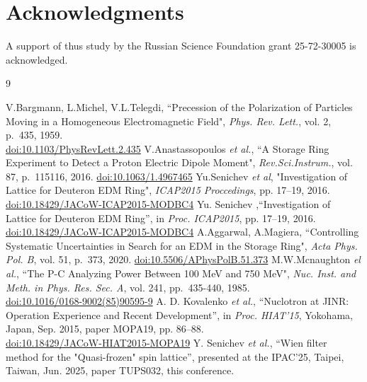 \documentclass[a4paper,
               keeplastbox,   %
               ]{jacow}
\begin{document}
\section{Acknowledgments}

\par A support of thus study by the Russian Science Foundation grant 25-72-30005 is acknowledged.

	{\printbibliography}
	{
	\begin{thebibliography}{9}
	
	 V.Bargmann, L.Michel, V.L.Telegdi, ``Precession of the Polarization of Particles Moving in a Homogeneous Electromagnetic Field", \emph{Phys. Rev. Lett.}, vol. 2, p.~435, 1959.\\ \url{doi:10.1103/PhysRevLett.2.435}
	 V.Anastassopoulos \emph{et al.}, ``A Storage Ring Experiment to Detect a Proton Electric Dipole Moment",  \emph{Rev.Sci.Instrum.}, vol. 87, p.~115116, 2016. \url{doi:10.1063/1.4967465}
	 Yu.Senichev \emph{et al}, "Investigation of Lattice for Deuteron EDM Ring", \textit{ICAP2015 Proccedings}, pp. 17--19, 2016. \url{doi:10.18429/JACoW-ICAP2015-MODBC4}
	 Yu. Senichev ,\textquotedblleft{Investigation of Lattice for Deuteron EDM Ring}\textquotedblright, in \emph{Proc. ICAP2015}, pp. 17--19, 2016. \url{doi:10.18429/JACoW-ICAP2015-MODBC4}
	 A.Aggarwal, A.Magiera, ``Controlling Systematic Uncertainties in Search for an EDM in the Storage Ring",  \emph{Acta Phys. Pol. B}, vol. 51, p.~373, 2020. \url{doi:10.5506/APhysPolB.51.373}
	 M.W.Mcnaughton \emph{el al.}, ``The P-C Analyzing Power Between 100 MeV and 750 MeV", \emph{Nuc. Inst. and Meth. in Phys. Res. Sec. A}, vol. 241, pp.~435-440, 1985.\\ \url{doi:10.1016/0168-9002(85)90595-9}
	A. D. Kovalenko \emph{et al.},
	\textquotedblleft{Nuclotron at JINR: Operation Experience and Recent Development}\textquotedblright,
	in \emph{Proc. HIAT’15}, Yokohama, Japan, Sep. 2015, paper MOPA19, pp. 86--88.\\ \url{doi:10.18429/JACoW-HIAT2015-MOPA19}
	 Y. Senichev \emph{et al.},
	 \textquotedblleft{Wien filter method for the "Quasi-frozen" spin lattice}\textquotedblright,
	 presented at the IPAC’25, Taipei, Taiwan, Jun. 2025, paper TUPS032, this conference.  
	
	\end{thebibliography}
}
\end{document}
